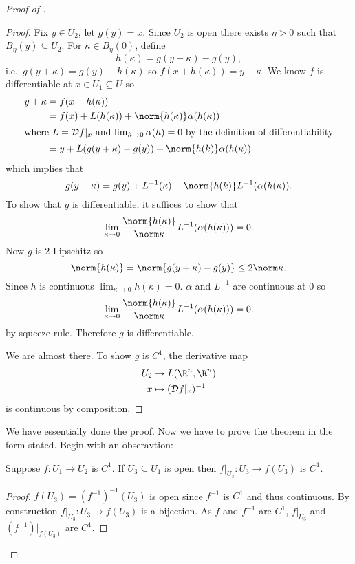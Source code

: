 \documentclass[a4paper]{article}
\newcommand*{\D}{\mathcal{D}}
\theoremstyle{definition}
\begin{document}
\begin{proof}[Proof of ]
  \begin{proof}
    Fix \(y \in U_2\), let \(g(y) = x\). Since \(U_2\) is open there exists \(\eta > 0\) such that \(B_\eta(y) \subseteq U_2\). For \(\kappa \in B_\eta(0)\), define
    \[
      h(\kappa) = g(y + \kappa) - g(y),
    \]
    i.e.\ \(g(y + \kappa) = g(y) + h(\kappa)\) so \(f(x + h(\kappa)) = y + \kappa\). We know \(f\) is differentiable at \(x \in U_1 \subseteq U\) so
    \begin{align*}
      y + \kappa &= f(x + h(\kappa)) \\
                 &= f(x) + L(h(\kappa)) + \norm{h(\kappa)} \alpha(h(\kappa)) \\
      \intertext{where \(L = \D f|_x\) and \(\lim_{h \to 0} \alpha(h) = 0\) by the definition of differentiability}
                 &= y + L(g(y + \kappa) - g(y)) + \norm{h(k)} \alpha(h(\kappa))
    \end{align*}
    which implies that
    \[
      g(y + \kappa) = g(y) + L^{-1}(\kappa) - \norm{h(k)} L^{-1}(\alpha(h(\kappa)).
    \]
    To show that \(g\) is differentiable, it suffices to show that
    \[
      \lim_{\kappa \to 0} \frac{\norm{h(\kappa)}}{\norm \kappa} L^{-1}(\alpha(h(\kappa))) = 0.
    \]
    Now \(g\) is \(2\)-Lipschitz so
    \[
      \norm{h(\kappa)} = \norm{g(y + \kappa) - g(y)} \leq 2 \norm \kappa.
    \]
    Since \(h\) is continuous \(\lim_{\kappa \to 0} h(\kappa) = 0\). \(\alpha\) and \(L^{-1}\) are continuous at \(0\) so
    \[
      \lim_{\kappa \to 0} \frac{\norm{h(\kappa)}}{\norm \kappa} L^{-1}(\alpha(h(\kappa))) = 0.
    \]
    by squeeze rule. Therefore \(g\) is differentiable.

    We are almost there. To show \(g\) is \(C^1\), the derivative map
    \begin{align*}
      U_2 &\to L(\R^n, \R^n) \\
      x &\mapsto (\D f|_x)^{-1}
    \end{align*}
    is continuous by composition.
  \end{proof}
  We have essentially done the proof. Now we have to prove the theorem in the form stated. Begin with an obseravtion:

  \begin{lemma}
    Suppose \(f: U_1 \to U_2\) is \(C^1\). If \(U_3 \subseteq U_1\) is open then \(f|_{U_3}: U_3 \to f(U_3)\) is \(C^1\).
  \end{lemma}

  \begin{proof}
    \(f(U_3) = (f^{-1})^{-1}(U_3)\) is open since \(f^{-1}\) is \(C^1\) and thus continuous. By construction \(f|_{U_3}: U_3 \to f(U_3)\) is a bijection. As \(f\) and \(f^{-1}\) are \(C^1\), \(f|_{U_3}\) and \((f^{-1})|_{f(U_3)}\) are \(C^1\).
  \end{proof}


\end{proof}
\end{document}

